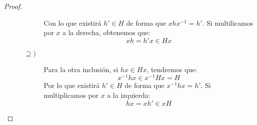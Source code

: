 \begin{prop}
\begin{proof}
\begin{description}
\begin{description}
\begin{equation*}
                        \end{equation*}
                        Con lo que existirá $h'\in H$ de forma que $xhx^{-1}=h'$. Si multilicamos por $x$ a la derecha, obtenemos que:
                        \begin{equation*}
                            xh = h'x \in Hx
                        \end{equation*}
                    \item [$\supseteq)$] Para la otra inclusión, si $hx\in Hx$, tendremos que:
                        \begin{equation*}
                            x^{-1}hx \in x^{-1}Hx = H
                        \end{equation*}
                        Por lo que existirá $h'\in H$ de forma que $x^{-1}hx = h'$. Si multiplicamos por $x$ a la izquierda:
                        \begin{equation*}
                            hx = xh' \in xH
                        \end{equation*}
                \end{description}
        \end{description}
    \end{proof}
\end{prop}

